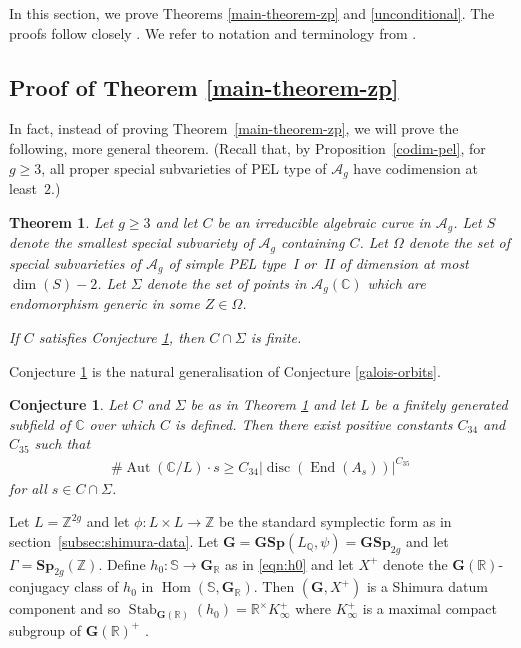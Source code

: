 \documentclass[11pt]{article}
\numberwithin{equation}{section}
\newcommand{\bC}{\mathbb{C}}
\newcommand{\bQ}{\mathbb{Q}}
\newcommand{\bR}{\mathbb{R}}
\newcommand{\bS}{\mathbb{S}}
\newcommand{\bZ}{\mathbb{Z}}
\newcommand{\cA}{\mathcal{A}}
\newcommand{\gG}{\mathbf{G}}
\newcommand{\gGSp}{\mathbf{GSp}}
\newcommand{\gSp}{\mathbf{Sp}}
\DeclareMathOperator{\Aut}{Aut}
\DeclareMathOperator{\disc}{disc}
\DeclareMathOperator{\End}{End}
\DeclareMathOperator{\Hom}{Hom}
\DeclareMathOperator{\Stab}{Stab}
\newtheorem{theorem}[lemma]{Theorem}
\newtheorem{conjecture}[lemma]{Conjecture}
\begin{document}
In this section, we prove Theorems \ref{main-theorem-zp} and \ref{unconditional}. The proofs follow closely \hbox{\cite[\S6]{QRTUI}}. We refer to notation and terminology from \cite[\S2.2 and 2.4]{Orr18}.

\subsection{Proof of Theorem \ref{main-theorem-zp}}

In fact, instead of proving Theorem~\ref{main-theorem-zp}, we will prove the following, more general theorem. (Recall that, by Proposition~\ref{codim-pel}, for $g\geq 3$, all proper special subvarieties of PEL type of $\cA_g$ have codimension at least~$2$.)

\begin{theorem}\label{ZP-end}
Let $g\geq 3$ and let $C$ be an irreducible algebraic curve in $\cA_g$. Let $S$ denote the smallest special subvariety of $\cA_g$ containing $C$.
Let $\Omega$ denote the set of special subvarieties of $\cA_g$ of simple PEL type~I or~II of dimension at most $\dim(S)-2$. Let $\Sigma$ denote the set of points in $\cA_g(\bC)$ which are endomorphism generic in some $Z\in\Omega$.

If $C$ satisfies Conjecture \ref{LGO-general}, then $C\cap\Sigma$ is finite.
\end{theorem}

Conjecture \ref{LGO-general} is the natural generalisation of Conjecture \ref{galois-orbits}.

\begin{conjecture}\label{LGO-general}
Let $C$ and $\Sigma$ be as in Theorem \ref{ZP-end} and let $L$ be a finitely generated subfield of $\bC$ over which $C$ is defined.
Then there exist positive constants $C_{34}$ and $C_{35}$ such that
\begin{align*}
\#\Aut(\bC/L)\cdot s\geq C_{34}|\disc(\End(A_s))|^{C_{35}}
\end{align*}
for all $s\in C\cap\Sigma$.
\end{conjecture}

Let $L=\bZ^{2g}$ and let $\phi:L\times L\to\bZ$ be the standard symplectic form as in section~\ref{subsec:shimura-data}.
Let $\gG=\gGSp(L_\bQ, \psi)=\gGSp_{2g}$ and let $\Gamma=\gSp_{2g}(\bZ)$.
Define $h_0 \colon \mathbb{S}\to\gG_\bR$ as in \eqref{eqn:h0} and let $X^+$ denote the $\gG(\bR)$-conjugacy class of $h_0$ in $\Hom(\bS, \gG_\bR)$.
Then $(\gG, X^+)$ is a Shimura datum component and so $\Stab_{\gG(\bR)}(h_0) = \bR^\times K^+_\infty$ where $K^+_\infty$ is a maximal compact subgroup of $\gG(\bR)^+$ \cite[Chap.\,6]{Mil05}.
\end{document}
